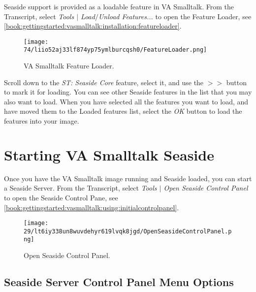 \documentclass[a4paper,10pt,twoside]{book}
\begin{document}
Seaside support is provided as a loadable feature in VA Smalltalk.  From the Transcript, select \textit{Tools $|$ Load$/$Unload Features...} to open the Feature Loader, see \autoref{book:gettingstarted:vasmalltalk:installation:featureloader}.

\begin{figure}[h!tbp]
	\begin{center}
		\texttt{[image: 74/liio52aj33lf874yp75ymlburcqsh0/FeatureLoader.png]}
		\caption{VA Smalltalk Feature Loader.\label{book:gettingstarted:vasmalltalk:installation:featureloader}}
	\end{center}
\end{figure}


Scroll down to the \textit{ST: Seaside Core} feature, select it, and use the \textit{$>$$>$} button to mark it for loading. You can see other Seaside features in the list that you may also want to load.  When you have selected all the features you want to load, and have moved them to the Loaded features list, select the \textit{OK} button to load the features into your image.

\section{Starting VA Smalltalk Seaside}
\label{book:gettingstarted:vasmalltalk:using}

Once you have the VA Smalltalk image running and Seaside loaded, you can start a Seaside Server.  From the Transcript, select \textit{Tools $|$ Open Seaside Control Panel} to open the Seaside Control Pane, see \autoref{book:gettingstarted:vasmalltalk:using:initialcontrolpanel}.

\begin{figure}[h!tbp]
	\begin{center}
		\texttt{[image: 29/lt6iy338un8wuvdehyr619lvqk8jgd/OpenSeasideControlPanel.png]}
		\caption{Open Seaside Control Panel.\label{book:gettingstarted:vasmalltalk:using:initialcontrolpanel}}
	\end{center}
\end{figure}


\subsection{Seaside Server Control Panel Menu Options}
\label{book:gettingstarted:vasmalltalk:using:controlpanel}
\end{document}
